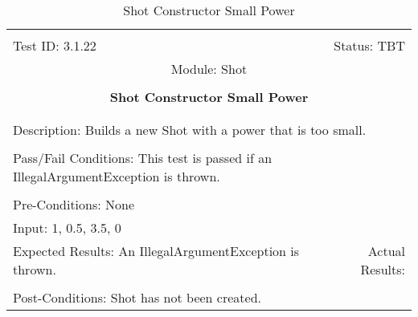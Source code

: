 \documentclass[titlepage]{article}
\begin{document}
\begin{center}%
\begin{table}[h!]
\begin{tabular}{|l r|}\hline&\\[-2mm]
	Test ID: 3.1.22	&Status: TBT\\[-3mm]
	\multicolumn{2}{|c|}{Module: Shot}\\&\\
	\multicolumn{2}{|c|}{\textbf{\large{Shot Constructor Small Power}}}\\&\\\hline&\\[-3mm]
	\multicolumn{2}{|p{\textwidth}|}{Description: Builds a new Shot with a power that is too small.}\\[1mm]\hline&\\[-3mm]
	\multicolumn{2}{|p{\textwidth}|}{Pass/Fail Conditions: This test is passed if an IllegalArgumentException is thrown.}\\[1mm]\hline&\\[-3mm]
	\multicolumn{2}{|p{\textwidth}|}{Pre-Conditions: None}\\[4mm]
	\multicolumn{2}{|p{\textwidth}|}{Input: 1, 0.5, 3.5, 0}\\[2mm]\hline
	\multicolumn{1}{|p{0.49\textwidth}}{Expected Results: An IllegalArgumentException is thrown.}	&\multicolumn{1}{|p{0.45\textwidth}|}{Actual Results: }\\\hline&\\[-3mm]
	\multicolumn{2}{|p{\textwidth}|}{Post-Conditions: Shot has not been created.}\\\hline
\end{tabular}
\caption{Shot Constructor Small Power}
\end{table}
\end{center}
\end{document}
